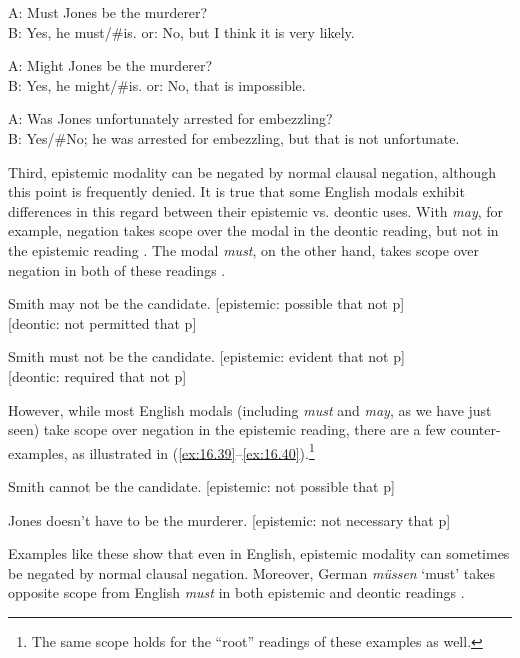 \ea \label{ex:16.34}
A: Must Jones be the murderer?\\
B: Yes, he must/\#is.  or: No, but I think it is very likely.
\z

\ea \label{ex:16.35}
A: Might Jones be the murderer?\\
B: Yes, he might/\#is.  or: No, that is impossible.
\z

\ea \label{ex:16.36}
A: Was Jones unfortunately arrested for embezzling?\\
B: Yes/\#No; he was arrested for embezzling, but that is not unfortunate.
\z


Third, epistemic modality can be negated by normal clausal negation, although this point is frequently denied. It is true that some English modals exhibit differences in this regard between their epistemic vs. deontic uses. With \textit{may}, for example, negation takes scope over the modal in the deontic reading, but not in the epistemic reading . The modal \textit{must}, on the other hand, takes scope over negation in both of these readings .


\ea \label{ex:16.37}
Smith may not be the candidate.  \hfill [epistemic: possible that not p]\\
                                 \hfill [deontic: not permitted that p]
\z

\ea \label{ex:16.38}
Smith must not be the candidate.  \hfill [epistemic: evident that not p]\\
                                  \hfill [deontic: required that not p]
\z


However, while most English modals (including \textit{must} and \textit{may}, as we have just seen) take scope over negation in the epistemic reading, there are a few counter-examples, as illustrated in (\ref{ex:16.39}--\ref{ex:16.40}).\footnote{The same scope holds for the “root” readings of these examples as well.}


\ea \label{ex:16.39}
Smith cannot be the candidate. \hfill [epistemic: not possible that p]
\z

\ea \label{ex:16.40}
Jones doesn’t have to be the murderer. \hfill [epistemic: not necessary that p]
\z


Examples like these show that even in English, epistemic modality can sometimes be negated by normal clausal negation. Moreover, German \textit{müssen} ‘must’ takes opposite scope from English \textit{must} in both epistemic and deontic readings .


